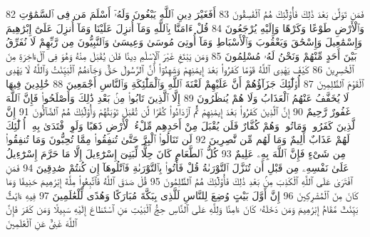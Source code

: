 {\tiny\colorbox{cl_aya}{82}} فَمَن تَوَلَّىٰ بَعْدَ ذَٰلِكَ فَأُو۟لَٰٓئِكَ هُمُ ٱلْفَٰسِقُونَ
{\tiny\colorbox{cl_aya}{83}} أَفَغَيْرَ دِينِ ٱللَّهِ يَبْغُونَ وَلَهُۥٓ أَسْلَمَ مَن فِى ٱلسَّمَٰوَٰتِ وَٱلْأَرْضِ طَوْعًا وَكَرْهًا وَإِلَيْهِ يُرْجَعُونَ
{\tiny\colorbox{cl_aya}{84}} قُلْ ءَامَنَّا بِٱللَّهِ وَمَآ أُنزِلَ عَلَيْنَا وَمَآ أُنزِلَ عَلَىٰٓ إِبْرَٰهِيمَ وَإِسْمَٰعِيلَ وَإِسْحَٰقَ وَيَعْقُوبَ وَٱلْأَسْبَاطِ وَمَآ أُوتِىَ مُوسَىٰ وَعِيسَىٰ وَٱلنَّبِيُّونَ مِن رَّبِّهِمْ لَا نُفَرِّقُ بَيْنَ أَحَدٍ مِّنْهُمْ وَنَحْنُ لَهُۥ مُسْلِمُونَ
{\tiny\colorbox{cl_aya}{85}} وَمَن يَبْتَغِ غَيْرَ ٱلْإِسْلَٰمِ دِينًا فَلَن يُقْبَلَ مِنْهُ وَهُوَ فِى ٱلْءَاخِرَةِ مِنَ ٱلْخَٰسِرِينَ
{\tiny\colorbox{cl_aya}{86}} كَيْفَ يَهْدِى ٱللَّهُ قَوْمًا كَفَرُوا۟ بَعْدَ إِيمَٰنِهِمْ وَشَهِدُوٓا۟ أَنَّ ٱلرَّسُولَ حَقٌّ وَجَآءَهُمُ ٱلْبَيِّنَٰتُ وَٱللَّهُ لَا يَهْدِى ٱلْقَوْمَ ٱلظَّٰلِمِينَ
{\tiny\colorbox{cl_aya}{87}} أُو۟لَٰٓئِكَ جَزَآؤُهُمْ أَنَّ عَلَيْهِمْ لَعْنَةَ ٱللَّهِ وَٱلْمَلَٰٓئِكَةِ وَٱلنَّاسِ أَجْمَعِينَ
{\tiny\colorbox{cl_aya}{88}} خَٰلِدِينَ فِيهَا لَا يُخَفَّفُ عَنْهُمُ ٱلْعَذَابُ وَلَا هُمْ يُنظَرُونَ
{\tiny\colorbox{cl_aya}{89}} إِلَّا ٱلَّذِينَ تَابُوا۟ مِنۢ بَعْدِ ذَٰلِكَ وَأَصْلَحُوا۟ فَإِنَّ ٱللَّهَ غَفُورٌ رَّحِيمٌ
{\tiny\colorbox{cl_aya}{90}} إِنَّ ٱلَّذِينَ كَفَرُوا۟ بَعْدَ إِيمَٰنِهِمْ ثُمَّ ٱزْدَادُوا۟ كُفْرًا لَّن تُقْبَلَ تَوْبَتُهُمْ وَأُو۟لَٰٓئِكَ هُمُ ٱلضَّآلُّونَ
{\tiny\colorbox{cl_aya}{91}} إِنَّ ٱلَّذِينَ كَفَرُوا۟ وَمَاتُوا۟ وَهُمْ كُفَّارٌ فَلَن يُقْبَلَ مِنْ أَحَدِهِم مِّلْءُ ٱلْأَرْضِ ذَهَبًا وَلَوِ ٱفْتَدَىٰ بِهِۦٓ أُو۟لَٰٓئِكَ لَهُمْ عَذَابٌ أَلِيمٌ وَمَا لَهُم مِّن نَّٰصِرِينَ
{\tiny\colorbox{cl_aya}{92}} لَن تَنَالُوا۟ ٱلْبِرَّ حَتَّىٰ تُنفِقُوا۟ مِمَّا تُحِبُّونَ وَمَا تُنفِقُوا۟ مِن شَىْءٍ فَإِنَّ ٱللَّهَ بِهِۦ عَلِيمٌ
{\tiny\colorbox{cl_aya}{93}} كُلُّ ٱلطَّعَامِ كَانَ حِلًّا لِّبَنِىٓ إِسْرَٰٓءِيلَ إِلَّا مَا حَرَّمَ إِسْرَٰٓءِيلُ عَلَىٰ نَفْسِهِۦ مِن قَبْلِ أَن تُنَزَّلَ ٱلتَّوْرَىٰةُ قُلْ فَأْتُوا۟ بِٱلتَّوْرَىٰةِ فَٱتْلُوهَآ إِن كُنتُمْ صَٰدِقِينَ
{\tiny\colorbox{cl_aya}{94}} فَمَنِ ٱفْتَرَىٰ عَلَى ٱللَّهِ ٱلْكَذِبَ مِنۢ بَعْدِ ذَٰلِكَ فَأُو۟لَٰٓئِكَ هُمُ ٱلظَّٰلِمُونَ
{\tiny\colorbox{cl_aya}{95}} قُلْ صَدَقَ ٱللَّهُ فَٱتَّبِعُوا۟ مِلَّةَ إِبْرَٰهِيمَ حَنِيفًا وَمَا كَانَ مِنَ ٱلْمُشْرِكِينَ
{\tiny\colorbox{cl_aya}{96}} إِنَّ أَوَّلَ بَيْتٍ وُضِعَ لِلنَّاسِ لَلَّذِى بِبَكَّةَ مُبَارَكًا وَهُدًى لِّلْعَٰلَمِينَ
{\tiny\colorbox{cl_aya}{97}} فِيهِ ءَايَٰتٌۢ بَيِّنَٰتٌ مَّقَامُ إِبْرَٰهِيمَ وَمَن دَخَلَهُۥ كَانَ ءَامِنًا وَلِلَّهِ عَلَى ٱلنَّاسِ حِجُّ ٱلْبَيْتِ مَنِ ٱسْتَطَاعَ إِلَيْهِ سَبِيلًا وَمَن كَفَرَ فَإِنَّ ٱللَّهَ غَنِىٌّ عَنِ ٱلْعَٰلَمِينَ
